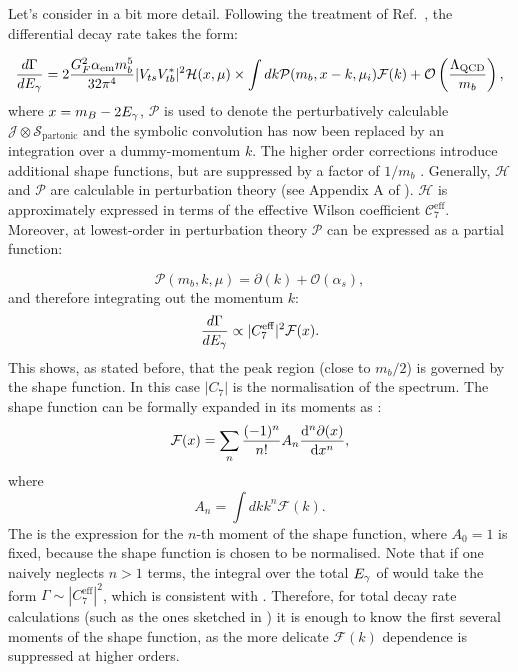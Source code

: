 Let's consider  in a bit more detail.
Following the treatment of Ref.~\cite{Ligeti:2008ac}, the differential decay rate takes the form:

\begin{equation}\label{eq:differential_decay_simba}
    \frac{d\Gamma}{dE_{\gamma}} = 2\frac{G_F^2\alpha_{\mathrm{em}} m_b^5}{32\pi^4}|V_{ts}V_{tb}^*|^2 \mathcal{H}(x, \mu) \times \int dk \mathcal{P}(m_b, x - k, \mu_i) \mathcal{F}(k) + {\cal O}\left(\frac{\Lambda_{\mathrm{QCD}}}{m_b}\right),
\end{equation}
where $x=m_B-2{E_{\gamma}}$, $\mathcal{P}$ is used to denote the perturbatively calculable $\mathcal{J}\otimes\mathcal{S_{\mathrm{partonic}}}$ and the symbolic convolution has now been replaced by an integration over a dummy-momentum $k$.
The higher order corrections introduce additional shape functions, but are suppressed by a factor of $1/m_b$ \cite{Neubert:2002yx}.
Generally, $\mathcal{H}$ and $\mathcal{P}$ are calculable in perturbation theory (see Appendix A of \cite{Ligeti:2008ac}).
$\mathcal{H}$ is approximately expressed in terms of the effective Wilson coefficient $\mathcal{C}_7^{\mathrm{eff}}$. 
Moreover, at lowest-order in perturbation theory $\mathcal{P}$ can be expressed as a partial function:

\begin{equation}
    \mathcal{P}(m_b,k,\mu) = \partial(k) + \mathcal{O}(\alpha_s),
\end{equation}
and therefore integrating out the momentum $k$:
\begin{equation}\label{eq:integrated_egamma}
    \frac{d\Gamma}{d{E_{\gamma}}} \propto |C_7^{\mathrm{eff}}|^2 \mathcal{F}(x).
\end{equation}
This shows, as stated before, that the peak region (close to $m_b/2$) is governed by the shape function.
In this case $|C_7|$ is the normalisation of the spectrum.
The shape function can be formally expanded in its moments as \cite{PhysRevD.50.2037,Ligeti:2008ac}:
\begin{equation}\label{eq:shape_function_expansion}
    \mathcal{F}(x) = \sum_n \frac{(-1)^n}{n!} A_n \dv[n]{\partial(x)}{x},
\end{equation}
where 
\begin{equation}\label{eq:moments_of_shape_function}
    A_n = \int dk k^n \mathcal{F}(k).
\end{equation}
The  is the expression for the $n$-th moment of the shape function, where 
$A_0=1$ is fixed, because the shape function is chosen to be normalised.
Note that if one naively neglects $n>1$ terms, the integral over the total ${E_{\gamma}}$ of  would take the form $\Gamma\sim|C_7^{\mathrm{eff}}|^2$, which is consistent with .
Therefore, for total decay rate calculations (such as the ones sketched in ) it is enough to know the first several moments of the shape function, as the more delicate $\mathcal{F}(k)$ dependence is suppressed at higher orders.

